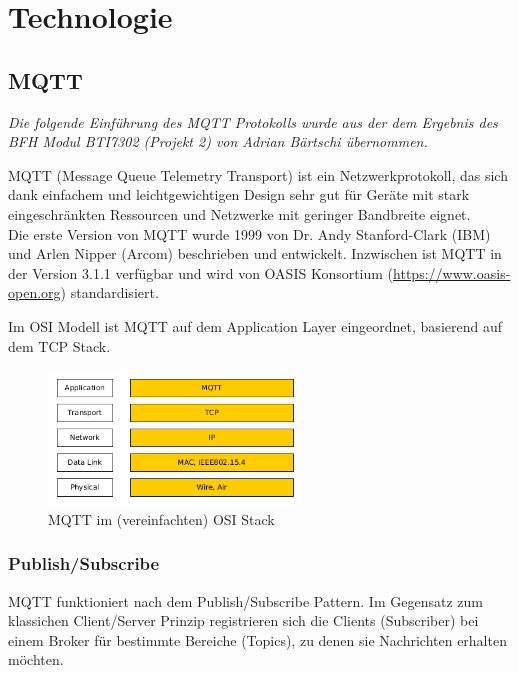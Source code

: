 \chapter{Technologie}
\label{chap:technologie}

\section{MQTT}

\textit{Die folgende Einführung des MQTT Protokolls wurde aus der dem Ergebnis des BFH Modul BTI7302 (Projekt 2) von Adrian Bärtschi übernommen.}

MQTT (Message Queue Telemetry Transport) ist ein Netzwerkprotokoll, das sich dank einfachem und leichtgewichtigen Design sehr gut für Geräte mit stark eingeschränkten Ressourcen und Netzwerke mit geringer Bandbreite eignet. 
\\
Die erste Version von MQTT wurde 1999 von Dr. Andy Stanford-Clark (IBM) und Arlen Nipper (Arcom) beschrieben und entwickelt. Inzwischen ist MQTT in der Version 3.1.1 verfügbar  \cite{mqttSpez} und wird von OASIS Konsortium (\url{https://www.oasis-open.org}) standardisiert.

Im OSI Modell ist MQTT auf dem Application Layer eingeordnet, basierend auf dem TCP Stack.

\begin{figure}[H]
	\centering
		\includegraphics[width=0.6\textwidth]{bilder/osi_mqtt.png}
	\caption{\label{fig:mqttosi}MQTT im (vereinfachten) OSI Stack}
\end{figure}

\subsection{Publish/Subscribe}
MQTT funktioniert nach dem Publish/Subscribe Pattern. Im Gegensatz zum klassichen Client/Server Prinzip registrieren sich die Clients (Subscriber) bei einem Broker für bestimmte Bereiche (Topics), zu denen sie Nachrichten erhalten möchten.
\\ \\

